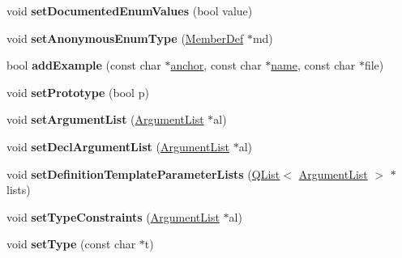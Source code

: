 \begin{DoxyCompactItemize}
\item 
\hypertarget{class_member_def_ac392c68e53ca3630252a0b6f7c5142ba}{void {\bfseries set\-Documented\-Enum\-Values} (bool value)}\label{class_member_def_ac392c68e53ca3630252a0b6f7c5142ba}

\item 
\hypertarget{class_member_def_a82642b47e585b90debbfcbd7978f68c2}{void {\bfseries set\-Anonymous\-Enum\-Type} (\hyperlink{class_member_def}{Member\-Def} $\ast$md)}\label{class_member_def_a82642b47e585b90debbfcbd7978f68c2}

\item 
\hypertarget{class_member_def_a6465272004bda4a4c659a6a2814154ee}{bool {\bfseries add\-Example} (const char $\ast$\hyperlink{class_member_def_acd17ae1d9600f864b1beb85dfb99a4f4}{anchor}, const char $\ast$\hyperlink{class_definition_a2c310e06c9aadc6fb218f80fcbb5c695}{name}, const char $\ast$file)}\label{class_member_def_a6465272004bda4a4c659a6a2814154ee}

\item 
\hypertarget{class_member_def_af3297b54d2b6f0f0aeae089eed468fa3}{void {\bfseries set\-Prototype} (bool p)}\label{class_member_def_af3297b54d2b6f0f0aeae089eed468fa3}

\item 
\hypertarget{class_member_def_a81fee11b0f473321fe88e113b54a585d}{void {\bfseries set\-Argument\-List} (\hyperlink{class_argument_list}{Argument\-List} $\ast$al)}\label{class_member_def_a81fee11b0f473321fe88e113b54a585d}

\item 
\hypertarget{class_member_def_abfb6acf3a7f72e76c2fea358d89d138b}{void {\bfseries set\-Decl\-Argument\-List} (\hyperlink{class_argument_list}{Argument\-List} $\ast$al)}\label{class_member_def_abfb6acf3a7f72e76c2fea358d89d138b}

\item 
\hypertarget{class_member_def_a5c99626a86e852bb96089bbfedd1b3ca}{void {\bfseries set\-Definition\-Template\-Parameter\-Lists} (\hyperlink{class_q_list}{Q\-List}$<$ \hyperlink{class_argument_list}{Argument\-List} $>$ $\ast$lists)}\label{class_member_def_a5c99626a86e852bb96089bbfedd1b3ca}

\item 
\hypertarget{class_member_def_ac805ef0f9105033770cacf6bb063547c}{void {\bfseries set\-Type\-Constraints} (\hyperlink{class_argument_list}{Argument\-List} $\ast$al)}\label{class_member_def_ac805ef0f9105033770cacf6bb063547c}

\item 
\hypertarget{class_member_def_a019017f3a56a0c3e4212a9a78eaf586f}{void {\bfseries set\-Type} (const char $\ast$t)}\label{class_member_def_a019017f3a56a0c3e4212a9a78eaf586f}


\end{DoxyCompactItemize}
